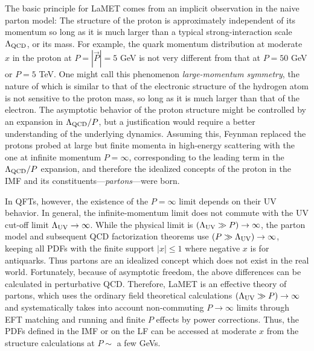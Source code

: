 \documentclass[aps,rmp,reprint,amsmath,amssymb,graphicx,longbibliography]{revtex4-1} %
\begin{document}
The basic principle for LaMET comes from an implicit
observation in the naive parton model:
The structure of the proton is approximately
independent of its momentum so long as it is much larger than
a typical strong-interaction scale $\Lambda_{\rm QCD}$, or its mass.
For example, the quark momentum distribution at moderate $x$ in the proton
at $P=|\vec{P}|=5$ GeV is not very different from that
at $P=50$ GeV or $P=5$ TeV. One might call this phenomenon
{\it large-momentum symmetry}, the nature of which is similar to that of the electronic
structure of the hydrogen atom is not sensitive to the proton mass, so long
as it is much larger than that of the electron.
The asymptotic behavior of the proton structure might be
controlled by an expansion in $\Lambda_{\rm QCD}/P$, but a justification would
require a better understanding of the underlying
dynamics. Assuming this, Feynman replaced the protons probed
at large but finite momenta in high-energy scattering with
the one at infinite momentum $P=\infty$,
corresponding to the leading term in the $\Lambda_{\rm QCD}/P$ expansion, and therefore
the idealized concepts of {\rm the proton in the IMF}
and its constituents---{\it partons}---were born.

In QFTs, however, the existence of the $P=\infty$ limit
depends on their UV behavior. In general, the infinite-momentum limit
does not commute with the UV cut-off limit $\Lambda_{\rm UV}\to \infty$.
While the physical limit is $(\Lambda_{\rm UV}\gg P) \to\infty$,
the parton model and subsequent QCD factorization
theorems use $(P\gg\Lambda_{\rm UV})\to\infty$, keeping
all PDFs with the finite support $|x|\le 1$ where negative $x$ is for antiquarks. Thus partons are an idealized concept
which does not exist in the real world.
Fortunately, because of asymptotic freedom, the above differences can be calculated in perturbative QCD.
Therefore, LaMET is an effective theory of partons, which uses the ordinary
field theoretical calculations $(\Lambda_{\rm UV}\gg P)\to\infty$ and
systematically takes into account non-commuting $P\to\infty$ limits through
EFT matching and running and finite $P$ effects by power corrections. Thus, the PDFs defined in the IMF
or on the LF can be accessed at moderate $x$ from the structure
calculations at $P\sim $ a few GeVs.
\end{document}

